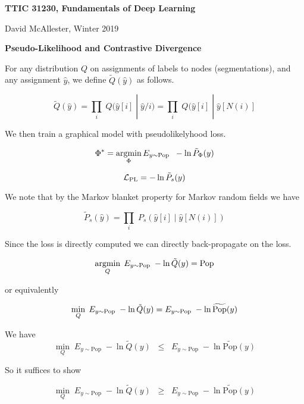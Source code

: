 




{\Huge

  \centerline{\bf TTIC 31230, Fundamentals of Deep Learning}
  \bigskip
  \centerline{David McAllester, Winter 2019}
  \vfill
  \vfill
  \centerline{\bf Pseudo-Likelihood and Contrastive Divergence}
\vfill
\vfill
\vfill


For any distribution {\color{red} $Q$} on assignments of labels to nodes (segmentations), and any assignment {\color{red} $\hat{y}$},
we define {\color{red} $\tilde{Q}(\hat{y})$} as follows.

{\color{red} $$\tilde{Q}(\hat{y}) = \prod_i\;Q(\hat{y}[i]\;|\; \hat{y}/i) = \prod_i\;Q(\hat{y}[i]\;|\; \hat{y}[N(i)]$$}

We then train a graphical model with pseudolikelyhood loss.

{\color{red} $$\Phi^* = \operatorname*{argmin}_\Phi E_{y \sim \mathrm{Pop}}\;\;-\ln \tilde{P}_\Phi(y)$$}



{\color{red} $${\cal L}_{\mathrm{PL}} = - \ln \tilde{P}_s(y)$$}

\vfill
We note that by the Markov blanket property for Markov random fields we have

{\color{red} $$\tilde{P}_s(\hat{y}) = \prod_i\;P_s(\hat{y}[i]\;|\; \hat{y}[N(i)])$$}

\vfill
Since the loss is directly computed we can directly back-propagate on the loss.




{\color{red} $$\operatorname*{argmin}_Q \; E_{y \sim \mathrm{Pop}} \;-\ln \tilde{Q}(y) = \mathrm{Pop}$$}

\vfill
or equivalently


\vfill
{\color{red} $$\min_Q \; E_{y \sim \mathrm{Pop}} \;-\ln \tilde{Q}(y) = E_{y \sim \mathrm{Pop}}\;-\ln \widetilde{\mathrm{Pop}}(y)$$}
\vfill


We have
$$\min_{Q} \;E_{y \sim \mathrm{Pop}}\;-\ln \tilde{Q}(y) \;\;\leq \;\; E_{y \sim \mathrm{Pop}}\;-\ln \widetilde{\mathrm{Pop}}(y)$$

\vfill
So it suffices to show

$$\min_{Q} \;E_{y \sim \mathrm{Pop}}\;-\ln \tilde{Q}(y) \;\;\geq \;\; E_{y \sim \mathrm{Pop}}\;-\ln \widetilde{\mathrm{Pop}}(y)$$


}
